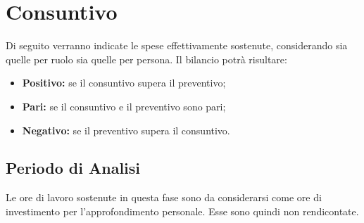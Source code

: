 \section{Consuntivo}
Di seguito verranno indicate le spese effettivamente sostenute, considerando sia quelle per ruolo sia quelle per persona. Il bilancio potrà risultare:
\begin{itemize}
	\item \textbf{Positivo:} se il consuntivo supera il preventivo;
	\item \textbf{Pari:} se il consuntivo e il preventivo sono pari;
	\item \textbf{Negativo:} se il preventivo supera il consuntivo.
\end{itemize}

\subsection{Periodo di Analisi}
Le ore di lavoro sostenute in questa fase sono da considerarsi come ore di investimento per l'approfondimento personale. Esse sono quindi non rendicontate.

